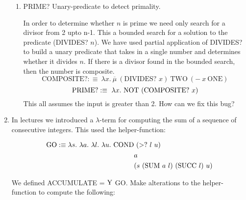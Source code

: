 \documentclass[11pt]{report}
\begin{document}
\begin{enumerate}
\begin{enumerate}
			\item PRIME? Unary-predicate to detect primality.
			
			In order to determine whether $n$ is prime we need only search for a divisor from 2 upto n-1. This a bounded search for a solution to the predicate (DIVIDES? $n$). We have used partial application of DIVIDES? to build a unary predicate that takes in a single number and determines whether it divides $n$. If there is a divisor found in the bounded search, then the number is composite. 
			$$\text{COMPOSITE?}:\equiv \ \lambda x. \ \overline{\mu} \ (\text{DIVIDES? } x) \ \text{TWO} \ (- \ x \ \text{ONE})$$			
			$$\text{PRIME?}:\equiv \ \lambda x. \ \NOT \ (\text{COMPOSITE? } x)$$
			This all assumes the input is greater than 2. How can we fix this bug?
		\end{enumerate}
	

	\newpage
	 \item In lectures we introduced a $\lambda$-term for computing the sum of a sequence of consecutive integers. This used the helper-function: 
	
	 \begin{align*}
	 	\GO :\equiv \lambda s. \ \lambda a. \ \lambda l. \ \lambda u. \ \COND & \ (>? \ l \ u) \\
	 	& a \\ 
	 	&(s \ (\SUM \ a \ l) \ (\SUCC \ l) \ u)
	 \end{align*}
	
	 We defined ACCUMULATE = $\text{Y}$ GO. Make alterations to the helper-function to compute the following: 
	

\end{enumerate}
\end{document}
